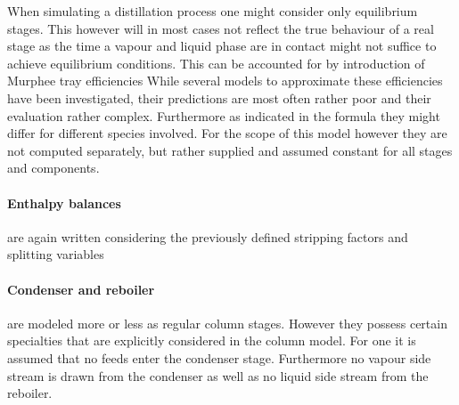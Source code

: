         When simulating a distillation process one might consider only equilibrium stages. This however
        will in most cases not reflect the true behaviour of a real stage as the time a vapour and
        liquid phase are in contact might not suffice to achieve equilibrium conditions. This can be
        accounted for by introduction of Murphee tray efficiencies \cite{Henley.op.2011}
        While several models to approximate these efficiencies have been investigated, their predictions are
        most often rather poor \cite{Coulson.1999} and their evaluation rather complex. Furthermore as indicated
        in the formula they might differ for different species involved. For the scope of this model however
        they are not computed separately, but rather supplied and assumed constant for all stages and components.

        \paragraph{Enthalpy balances} are again written considering the previously defined stripping factors
        and splitting variables
        \paragraph{Condenser and reboiler} are modeled more or less as regular column stages. However
        they possess certain specialties that are explicitly considered in the column model. For one it is assumed
        that no feeds enter the condenser stage. Furthermore no vapour side stream is drawn from the condenser as well as
        no liquid side stream from the reboiler.

